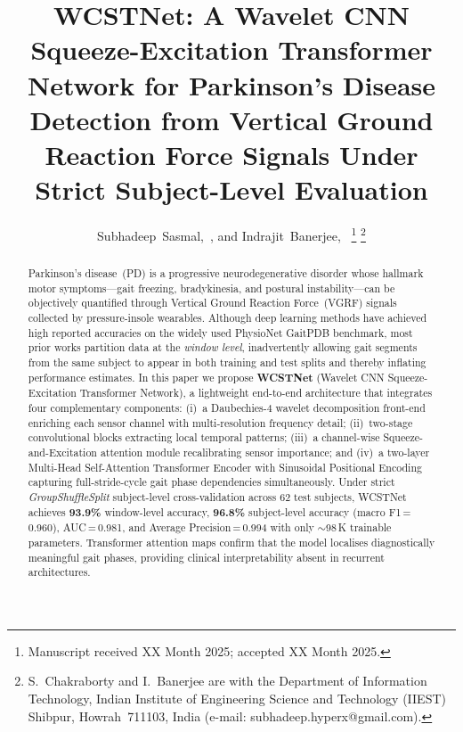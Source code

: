 \documentclass[lettersize,journal]{IEEEtran}
\begin{document}
\title{WCSTNet: A Wavelet CNN Squeeze-Excitation Transformer Network
for Parkinson's Disease Detection from Vertical Ground Reaction
Force Signals Under Strict Subject-Level Evaluation}

\author{Subhadeep~Sasmal,~,
        and Indrajit~Banerjee,~
\thanks{Manuscript received XX Month 2025; accepted XX Month 2025.}
\thanks{S.~Chakraborty and I.~Banerjee are with the Department of
Information Technology, Indian Institute of Engineering Science and
Technology (IIEST) Shibpur, Howrah~711103, India
(e-mail: subhadeep.hyperx@gmail.com).}}

\maketitle

\begin{abstract}
Parkinson's disease~(PD) is a progressive neurodegenerative disorder
whose hallmark motor symptoms—gait freezing, bradykinesia, and postural
instability—can be objectively quantified through Vertical Ground
Reaction Force~(VGRF) signals collected by pressure-insole wearables.
Although deep learning methods have achieved high reported accuracies on
the widely used PhysioNet GaitPDB benchmark, most prior works partition
data at the \emph{window level}, inadvertently allowing gait segments
from the same subject to appear in both training and test splits and
thereby inflating performance estimates.
In this paper we propose \textbf{WCSTNet} (Wavelet CNN
Squeeze-Excitation Transformer Network), a lightweight end-to-end
architecture that integrates four complementary components:
(i)~a Daubechies-4 wavelet decomposition front-end enriching each
sensor channel with multi-resolution frequency detail;
(ii)~two-stage convolutional blocks extracting local temporal patterns;
(iii)~a channel-wise Squeeze-and-Excitation attention module
recalibrating sensor importance; and
(iv)~a two-layer Multi-Head Self-Attention Transformer Encoder with
Sinusoidal Positional Encoding capturing full-stride-cycle gait phase
dependencies simultaneously.
Under strict \textit{GroupShuffleSplit} subject-level cross-validation
across 62 test subjects, WCSTNet achieves \textbf{93.9\%} window-level
accuracy, \textbf{96.8\%} subject-level accuracy (macro F1\,=\,0.960),
AUC\,=\,0.981, and Average Precision\,=\,0.994 with only
${\sim}$98\,K trainable parameters.
Transformer attention maps confirm that the model localises
diagnostically meaningful gait phases, providing clinical
interpretability absent in recurrent architectures.
\end{abstract}
\end{document}
